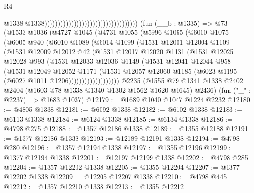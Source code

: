 \begin{lexlean}{R4}
\begin{coremodule}
                                                                          @1338
                                                                          @1338)))))))))))))))))))))))))))))))))))
    (fun (__b : @1335) =>
    @73
      (@1533
        @1036
        (@4727
          @1045
          (@4731
            @1055
            (@5996
              @1065
              (@6000
                @1075
                (@6005
                  @940
                  (@6010
                    @1089
                    (@6014
                      @1099
                      (@1531
                        @12001
                        @12004
                        @1109
                        (@1531
                          @12009
                          @12012
                          @42
                          (@1531
                            @12017
                            @12020
                            @1131
                            (@1531
                              @12025
                              @12028
                              @993
                              (@1531
                                @12033
                                @12036
                                @1149
                                (@1531
                                  @12041
                                  @12044
                                  @958
                                  (@1531
                                    @12049
                                    @12052
                                    @1171
                                    (@1531
                                      @12057
                                      @12060
                                      @1185
                                      (@6023 @1195 (@6027 @1011 @1206)))))))))))))))))))
    @2235
    (@1555 @79 @1341 @1338 @2402 @2404 (@1603 @78 @1338 @1340 @1302 @1562 @1620 @1645) @2436)
    (fun ("_" : @2237) => @1683 @1037)
@12179 := @1689 @1040 @1047 @1224 @2232
@12180 := @4805 @1338
@12181 := @6092 @1338
@12182 := @6102 @1338
@12183 := @6113 @1338
@12184 := @6124 @1338
@12185 := @6134 @1338
@12186 := @4798 @275
@12188 := @1357 @12186 @1338
@12189 := @1355 @12188
@12191 := @1377 @12186 @1338
@12193 := @12189 @12191 @1338
@12194 := @4798 @280
@12196 := @1357 @12194 @1338
@12197 := @1355 @12196
@12199 := @1377 @12194 @1338
@12201 := @12197 @12199 @1338
@12202 := @4798 @285
@12204 := @1357 @12202 @1338
@12205 := @1355 @12204
@12207 := @1377 @12202 @1338
@12209 := @12205 @12207 @1338
@12210 := @4798 @445
@12212 := @1357 @12210 @1338
@12213 := @1355 @12212

\end{coremodule}
\end{lexlean}
